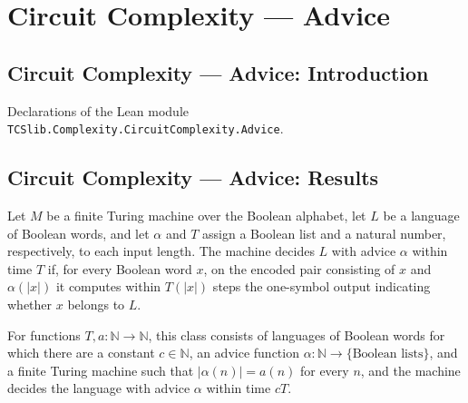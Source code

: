 \section{Circuit Complexity --- Advice}
\subsection*{Circuit Complexity --- Advice: Introduction}

Declarations of the Lean module \texttt{TCSlib.Complexity.CircuitComplexity.Advice}.

\subsection*{Circuit Complexity --- Advice: Results}

\begin{definition}
\label{Turing.FinTM.DecidesWithAdviceInTime}
\leanok
{}
Let $M$ be a finite Turing machine over the Boolean alphabet, let $L$ be a language of
Boolean words, and let $\alpha$ and $T$ assign a Boolean list and a natural number,
respectively, to each input length. The machine decides $L$ with advice $\alpha$ within
time $T$ if, for every Boolean word $x$, on the encoded pair consisting of $x$ and
$\alpha(|x|)$ it computes within $T(|x|)$ steps the one-symbol output indicating whether
$x$ belongs to $L$.
\end{definition}

\begin{definition}
\label{Complexity.DTIMEAdvice}
\leanok
{}
For functions $T,a\colon\mathbb{N}\to\mathbb{N}$, this class consists of languages of
Boolean words for which there are a constant $c\in\mathbb{N}$, an advice function
$\alpha\colon\mathbb{N}\to\{\text{Boolean lists}\}$, and a finite Turing machine such
that $|\alpha(n)|=a(n)$ for every $n$, and the machine decides the language with advice
$\alpha$ within time $cT$.
\end{definition}

